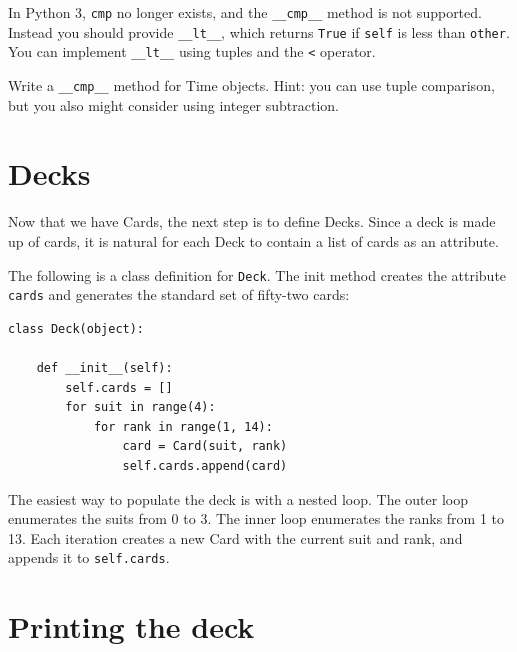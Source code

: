 \documentclass[10pt]{book}
\begin{document}
In Python 3, {\tt cmp} no longer exists, and the \verb"__cmp__"
method is not supported.  Instead you should provide \verb"__lt__",
which returns {\tt True} if {\tt self} is less than {\tt other}.
You can implement \verb"__lt__" using tuples and the \verb"<"
operator.

\begin{exercise}

Write a \verb"__cmp__" method for Time objects.  Hint: you
can use tuple comparison, but you also might consider using
integer subtraction.



\end{exercise}


\section{Decks}

Now that we have Cards, the next step is to define Decks.  Since a
deck is made up of cards, it is natural for each Deck to contain a
list of cards as an attribute.

The following is a class definition for {\tt Deck}.  The
init method creates the attribute {\tt cards} and generates
the standard set of fifty-two cards:

\begin{verbatim}
class Deck(object):

    def __init__(self):
        self.cards = []
        for suit in range(4):
            for rank in range(1, 14):
                card = Card(suit, rank)
                self.cards.append(card)
\end{verbatim}
%
The easiest way to populate the deck is with a nested loop.  The outer
loop enumerates the suits from 0 to 3.  The inner loop enumerates the
ranks from 1 to 13.  Each iteration
creates a new Card with the current suit and rank,
and appends it to {\tt self.cards}.


\section{Printing the deck}
\label{printdeck}
\end{document}
